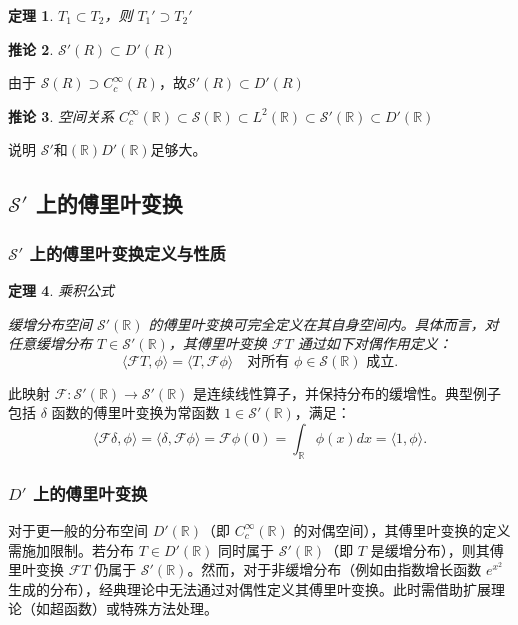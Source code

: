 \documentclass[12pt,a4paper]{article}
\newcommand{\diff}{\mathop{}\!\mathrm{d}}  %
\newcommand{\R}{\mathbb{R}}                %
\def\R{R}%
\def\diff{d}%
\theoremstyle{plain}
\newtheorem{theorem}{定理}[section]
\newtheorem{corollary}[theorem]{推论}  %
\theoremstyle{definition}
\theoremstyle{remark}
\begin{document}
\begin{theorem}
	\(T_1 \subset T_2\)，则 \(T_1' \supset T_2'\)
\end{theorem}

\begin{corollary}
	$\mathcal{S}'(\R) \subset D'(\R)$
\end{corollary}

由于 $\mathcal{S}(\R) \supset C_c^\infty(\R)$，故$\mathcal{S}'(\R) \subset D'(\R)$

\begin{corollary}空间关系
$C_c^\infty(\mathbb{R}) \subset \mathcal{S}(\mathbb{R}) \subset L^2(\mathbb{R}) \subset \mathcal{S}'(\mathbb{R}) \subset D'(\mathbb{R})$	
\end{corollary}
说明 $\mathcal{S}'$和$(\mathbb{R})D'(\mathbb{R})$足够大。


\subsection{$\mathcal{S}'$  上的傅里叶变换}

\subsubsection{$\mathcal{S}'$  上的傅里叶变换定义与性质}

\begin{theorem}乘积公式
	
	缓增分布空间 $\mathcal{S}'(\mathbb{R})$ 的傅里叶变换可完全定义在其自身空间内。具体而言，对任意缓增分布 $T \in \mathcal{S}'(\mathbb{R})$，其傅里叶变换 $\mathcal{F}T$ 通过如下对偶作用定义：
	\[
	\langle \mathcal{F}T, \phi \rangle = \langle T, \mathcal{F}\phi \rangle \quad \text{对所有 } \phi \in \mathcal{S}(\mathbb{R}) \text{ 成立}.
	\]
\end{theorem}	
	
	
	此映射 $\mathcal{F}: \mathcal{S}'(\mathbb{R}) \to \mathcal{S}'(\mathbb{R})$ 是连续线性算子，并保持分布的缓增性。典型例子包括  $\delta$ 函数的傅里叶变换为常函数 $1 \in \mathcal{S}'(\mathbb{R})$，满足：
	\[
	\langle \mathcal{F}\delta, \phi \rangle = \langle \delta, \mathcal{F}\phi \rangle = \mathcal{F}\phi(0) = \int_{\mathbb{R}} \phi(x) \diff x = \langle 1, \phi \rangle.
	\]


\subsubsection{ $D'$ 上的傅里叶变换}

	对于更一般的分布空间 $D'(\mathbb{R})$（即 $C_c^\infty(\mathbb{R})$ 的对偶空间），其傅里叶变换的定义需施加限制。若分布 $T \in D'(\mathbb{R})$ 同时属于 $\mathcal{S}'(\mathbb{R})$（即 $T$ 是缓增分布），则其傅里叶变换 $\mathcal{F}T$ 仍属于 $\mathcal{S}'(\mathbb{R})$。然而，对于非缓增分布（例如由指数增长函数 $e^{x^2}$ 生成的分布），经典理论中无法通过对偶性定义其傅里叶变换。此时需借助扩展理论（如超函数）或特殊方法处理。
\end{document}
